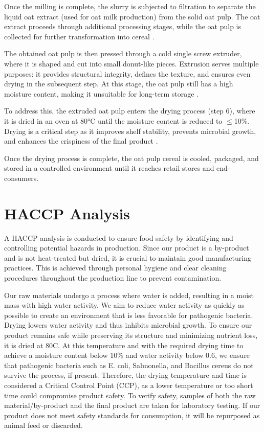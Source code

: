 \vline

Once the milling is complete, the slurry is subjected to filtration to separate the liquid oat extract (used for oat milk production) from the solid oat pulp. The oat extract proceeds through additional processing stages, while the oat pulp is collected for further transformation into cereal \cite*{05_article}. 

\vline

The obtained oat pulp is then pressed through a cold single screw extruder, where it is shaped and cut into small donut-like pieces. Extrusion serves multiple purposes: it provides structural integrity, defines the texture, and ensures even drying in the subsequent step. At this stage, the oat pulp still has a high moisture content, making it unsuitable for long-term storage \cite*{05_article}. 

\vline

To address this, the extruded oat pulp enters the drying process (step 6), where it is dried in an oven at 80°C until the moisture content is reduced to $\leq$10\%. Drying is a critical step as it improves shelf stability, prevents microbial growth, and enhances the crispiness of the final product \cite*{05_article}. 

\vline

Once the drying process is complete, the oat pulp cereal is cooled, packaged, and stored in a controlled environment until it reaches retail stores and end-consumers.

\section{HACCP Analysis}
A HACCP analysis is conducted to ensure food safety by identifying and controlling potential hazards in production. Since our product is a by-product and is not heat-treated but dried, it is crucial to maintain good manufacturing practices. This is achieved through personal hygiene and clear cleaning procedures throughout the production line to prevent contamination. 

\vline

Our raw materials undergo a process where water is added, resulting in a moist mass with high water activity. We aim to reduce water activity as quickly as possible to create an environment that is less favorable for pathogenic bacteria. Drying lowers water activity and thus inhibits microbial growth. To ensure our product remains safe while preserving its structure and minimizing nutrient loss, it is dried at 80\textdegree C. At this temperature and with the required drying time to achieve a moisture content below 10\% and water activity below 0.6, we ensure that pathogenic bacteria such as E. coli, Salmonella, and Bacillus cereus do not survive the process, if present. Therefore, the drying temperature and time is considered a Critical Control Point (CCP), as a lower temperature or too short time could compromise product safety.  To verify safety, samples of both the raw material/by-product and the final product are taken for laboratory testing. If our product does not meet safety standards for consumption, it will be repurposed as animal feed or discarded. 

